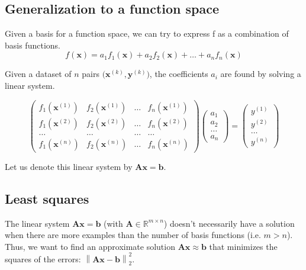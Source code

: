 \documentclass[10pt]{article}%
\renewcommand{\vec}[1]{\boldsymbol{#1}}
\newcommand{\norm}[1]{\left\lVert#1\right\rVert}
\begin{document}
\subsection{Generalization to a function space}
Given a basis for a function space, we can try to express {\Tt{}f\nwendquote} as a combination
of basis functions.
\[
f(\vec{x}) = a_1 f_1(\vec{x}) + a_2 f_2(\vec{x}) + \dots + a_n f_n(\vec{x})
\]

Given a dataset of $n$ pairs $\biggl(\vec{x}^{(k)},\vec{y}^{(k)}\biggr)$, the
coefficients $a_i$ are found by solving a linear system.

\[
\left( \begin{array}{ccccc}
f_1(\vec{x}^{(1)}) & f_2(\vec{x}^{(1)}) & \dots & f_n(\vec{x}^{(1)}) \\
f_1(\vec{x}^{(2)}) & f_2(\vec{x}^{(2)}) & \dots & f_n(\vec{x}^{(2)}) \\
\dots & \dots & \dots & \dots \\
f_1(\vec{x}^{(n)}) & f_2(\vec{x}^{(n)}) & \dots & f_n(\vec{x}^{(n)})
\end{array} \right)
\left( \begin{array}{c}
a_1 \\ a_2 \\ \dots \\ a_{n} 
\end{array} \right)
=
\left( \begin{array}{c}
y^{(1)} \\ y^{(2)} \\ \dots \\ y^{(n)} 
\end{array} \right)
\]

Let us denote this linear system by $\vec{A}\vec{x}=\vec{b}$.

\subsection{Least squares}
The linear system $\vec{A}\vec{x}=\vec{b}$
(with $\vec{A} \in \mathbb{R}^{m \times n}$) doesn't necessarily have a solution
when there are more examples than the number of basis functions (i.e. $m>n$).
Thus, we want to find an approximate solution $\vec{A}\vec{x}\approx\vec{b}$
that minimizes the squares of the errors: $\norm{\vec{A}\vec{x}-\vec{b}}^2_2$.
\end{document}
